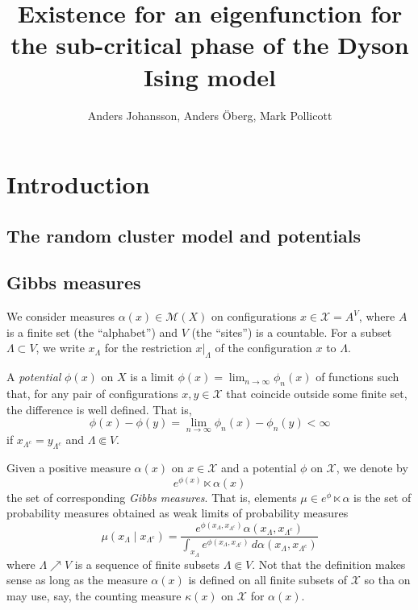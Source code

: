 \documentclass[11pt, a4paper, oneside]{article}
\title{Existence for an eigenfunction for the sub-critical phase of the Dyson
  Ising model}
\author{Anders Johansson, Anders \"Oberg, Mark Pollicott}
\date{}
\theoremstyle{definition}
\theoremstyle{remark}
\renewcommand{\d}{\,d}
\providecommand{\mscr}{\mathscr}
\def\X{\mscr X}
\begin{document}
\maketitle


\section{Introduction}\noindent


\def\gibb{\dot\ltimes}
\def\gibbs{\ltimes}

\subsection{The random cluster model and potentials}

\subsection{Gibbs measures}
We consider measures $\alpha(x) \in \mscr M(X)$ on configurations $x\in\X = A^V$,
where $A$ is a finite set (the ``alphabet'') and $V$ (the ``sites'') is a
countable. For a subset $\Lambda\subset V$, we write $x_\Lambda$ for the
restriction $x\vert_\Lambda$ of the configuration $x$ to $\Lambda$.

A \emph{potential} $\phi(x)$ on $X$ is a limit
$\phi(x) = \lim_{n\to\infty}\phi_n(x)$ of functions such that, for any pair of
configurations $x,y\in\X$ that coincide outside some finite set, the difference
is well defined. That is,
\begin{equation}\label{eq:potential}
\phi(x)-\phi(y) = \lim_{n\to\infty} \phi_n(x) - \phi_n(y) < \infty
\end{equation}
if $x_{\Lambda^c}=y_{\Lambda^c}$ and $\Lambda\Subset V$.

Given a positive measure $\alpha(x)$ on $x\in\X$ and a potential $\phi$ on
$\X$, we denote by
\[
  e^{\phi(x)} \gibbs \alpha(x)
\]
the set of corresponding \emph{Gibbs measures}. That is, elements
$\mu\in e^{\phi}\gibbs \alpha$ is the set of probability measures obtained as
weak limits of probability measures
\[
  \mu(x_\Lambda\mid x_{\Lambda^c}) =
  \frac {e^{\phi(x_\Lambda,x_{\Lambda^c})}\alpha(x_{\Lambda},x_{\Lambda^c})}
  {\int_{x_\Lambda} e^{\phi(x_\Lambda,x_{\Lambda^c})}\d \alpha(x_{\Lambda},x_{\Lambda^c})}
\]
where $\Lambda\nearrow V$ is a sequence of finite subsets $\Lambda\Subset V$.
Not that the definition makes sense as long as the measure $\alpha(x)$ is
defined on all finite subsets of $\X$ so tha on may use, say, the counting
measure $\kappa(x)$ on $\X$ for $\alpha(x)$.
\end{document}
